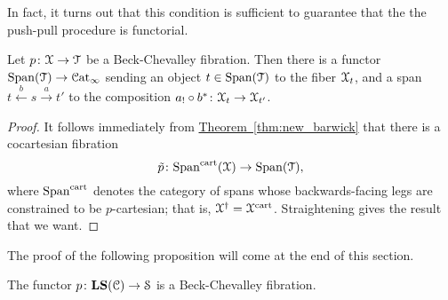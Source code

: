 \documentclass[main.tex]{subfiles}
\begin{document}
In fact, it turns out that this condition is sufficient to guarantee that the the push-pull procedure is functorial.

\begin{proposition}
  Let $p\colon \mathcal{X} \to \mathcal{T}$ be a Beck-Chevalley fibration. Then there is a functor $\mathrm{Span}(\mathcal{T}) \to \mathcal{C}\mathrm{at}_{\infty}$ sending an object $t \in \mathrm{Span}(\mathcal{T})$ to the fiber $\mathcal{X}_{t}$, and a span $t \overset{b}{\leftarrow} s \overset{a}{\rightarrow} t'$ to the composition $a_{!} \circ b^{*}\colon \mathcal{X}_{t} \to \mathcal{X}_{t'}$.
\end{proposition}
\begin{proof}
  It follows immediately from \hyperref[thm:new_barwick]{Theorem~\ref*{thm:new_barwick}} that there is a cocartesian fibration
  \begin{equation*}
    \tilde{p}\colon \mathrm{Span}^{\mathrm{cart}}(\mathcal{X}) \to \mathrm{Span}(\mathcal{T}),
  \end{equation*}
  where $\mathrm{Span}^{\mathrm{cart}}$ denotes the category of spans whose backwards-facing legs are constrained to be $p$-cartesian; that is, $\mathcal{X}^{\dagger} = \mathcal{X}^{\mathrm{cart}}$. Straightening gives the result that we want.
\end{proof}


The proof of the following proposition will come at the end of this section.

\begin{proposition}
  \label{prop:local_systems_are_beck_chevalley}
  The functor $p\colon \mathbf{LS}(\mathcal{C}) \to \mathcal{S}$ is a Beck-Chevalley fibration.
\end{proposition}
\end{document}
